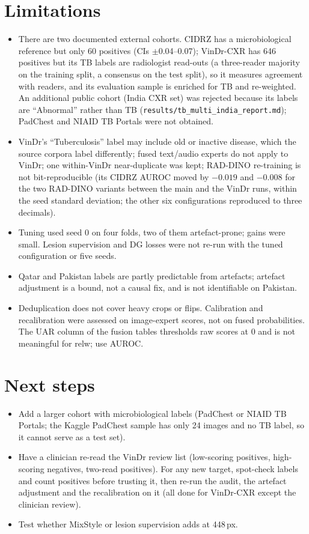 \documentclass[10pt,a4paper]{article}
\begin{document}
\section{Limitations}
\begin{itemize}
\item There are two documented external cohorts. CIDRZ has a microbiological reference but only 60 positives (CIs $\pm$0.04--0.07); VinDr-CXR has 646 positives but its TB labels are radiologist read-outs (a three-reader majority on the training split, a consensus on the test split), so it measures agreement with readers, and its evaluation sample is enriched for TB and re-weighted. An additional public cohort (India CXR set) was rejected because its labels are ``Abnormal'' rather than TB (\texttt{results/tb\_multi\_india\_report.md}); PadChest and NIAID TB Portals were not obtained.
\item VinDr's ``Tuberculosis'' label may include old or inactive disease, which the source corpora label differently; fused text/audio experts do not apply to VinDr; one within-VinDr near-duplicate was kept; RAD-DINO re-training is not bit-reproducible (its CIDRZ AUROC moved by $-0.019$ and $-0.008$ for the two RAD-DINO variants between the main and the VinDr runs, within the seed standard deviation; the other six configurations reproduced to three decimals).
\item Tuning used seed 0 on four folds, two of them artefact-prone; gains were small. Lesion supervision and DG losses were not re-run with the tuned configuration or five seeds.
\item Qatar and Pakistan labels are partly predictable from artefacts; artefact adjustment is a bound, not a causal fix, and is not identifiable on Pakistan.
\item Deduplication does not cover heavy crops or flips. Calibration and recalibration were assessed on image-expert scores, not on fused probabilities. The UAR column of the fusion tables thresholds raw scores at 0 and is not meaningful for relw; use AUROC.
\end{itemize}

\section{Next steps}
\begin{itemize}
\item Add a larger cohort with microbiological labels (PadChest or NIAID TB Portals; the Kaggle PadChest sample has only 24 images and no TB label, so it cannot serve as a test set).
\item Have a clinician re-read the VinDr review list (low-scoring positives, high-scoring negatives, two-read positives). For any new target, spot-check labels and count positives before trusting it, then re-run the audit, the artefact adjustment and the recalibration on it (all done for VinDr-CXR except the clinician review).
\item Test whether MixStyle or lesion supervision adds at 448\,px.
\end{itemize}
\end{document}
